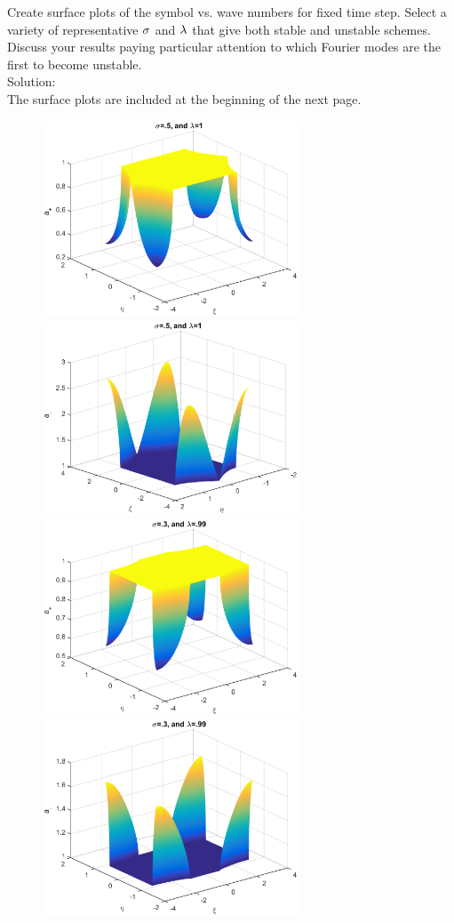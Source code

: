 			
			\item Create surface plots of the symbol vs. wave numbers for fixed time step. Select a variety of representative $\sigma$ and $\lambda$ that give both stable and unstable schemes. Discuss your results paying particular attention to which Fourier modes are the first to become unstable.\\
			
			Solution:\\
			
			The surface plots are included at the beginning of the next page.
			\begin{figure}
			\centering
			\includegraphics[width=3in]{symvwav1p}
			\includegraphics[width=3in]{symvwav1m}\\
			\includegraphics[width=3in]{symvwav2p}
			\includegraphics[width=3in]{symvwav2m}\\

\end{figure}
